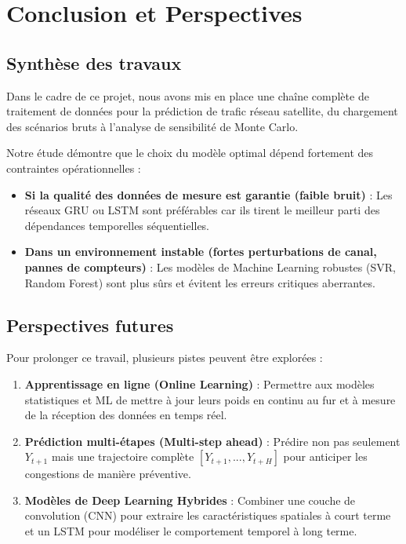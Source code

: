 \documentclass[11pt,a4paper]{article}
\begin{document}
\section{Conclusion et Perspectives}
\label{sec:conclusion}
\subsection{Synthèse des travaux}
Dans le cadre de ce projet, nous avons mis en place une chaîne complète de traitement de données pour la prédiction de trafic réseau satellite, du chargement des scénarios bruts à l'analyse de sensibilité de Monte Carlo. 

Notre étude démontre que le choix du modèle optimal dépend fortement des contraintes opérationnelles :
\begin{itemize}
    \item \textbf{Si la qualité des données de mesure est garantie (faible bruit)} : Les réseaux GRU ou LSTM sont préférables car ils tirent le meilleur parti des dépendances temporelles séquentielles.
    \item \textbf{Dans un environnement instable (fortes perturbations de canal, pannes de compteurs)} : Les modèles de Machine Learning robustes (SVR, Random Forest) sont plus sûrs et évitent les erreurs critiques aberrantes.
\end{itemize}

\subsection{Perspectives futures}
Pour prolonger ce travail, plusieurs pistes peuvent être explorées :
\begin{enumerate}
    \item \textbf{Apprentissage en ligne (Online Learning)} : Permettre aux modèles statistiques et ML de mettre à jour leurs poids en continu au fur et à mesure de la réception des données en temps réel.
    \item \textbf{Prédiction multi-étapes (Multi-step ahead)} : Prédire non pas seulement $Y_{t+1}$ mais une trajectoire complète $[Y_{t+1}, ..., Y_{t+H}]$ pour anticiper les congestions de manière préventive.
    \item \textbf{Modèles de Deep Learning Hybrides} : Combiner une couche de convolution (CNN) pour extraire les caractéristiques spatiales à court terme et un LSTM pour modéliser le comportement temporel à long terme.
\end{enumerate}
\end{document}
